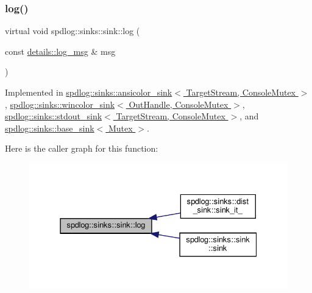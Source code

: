 \subsubsection{\texorpdfstring{log()}{log()}}
{\footnotesize\ttfamily virtual void spdlog\+::sinks\+::sink\+::log (\begin{DoxyParamCaption}\item[{const \hyperlink{structspdlog_1_1details_1_1log__msg}{details\+::log\+\_\+msg} \&}]{msg }\end{DoxyParamCaption})\hspace{0.3cm}{\ttfamily [pure virtual]}}



Implemented in \hyperlink{classspdlog_1_1sinks_1_1ansicolor__sink_a042a6ab886430570095737e1984e7c6e}{spdlog\+::sinks\+::ansicolor\+\_\+sink$<$ Target\+Stream, Console\+Mutex $>$}, \hyperlink{classspdlog_1_1sinks_1_1wincolor__sink_a64d98363a05d1a7a4f295f6de1b5cec1}{spdlog\+::sinks\+::wincolor\+\_\+sink$<$ Out\+Handle, Console\+Mutex $>$}, \hyperlink{classspdlog_1_1sinks_1_1stdout__sink_adda1fffa1daf4565f72b3e94734d984a}{spdlog\+::sinks\+::stdout\+\_\+sink$<$ Target\+Stream, Console\+Mutex $>$}, and \hyperlink{classspdlog_1_1sinks_1_1base__sink_a6a72602ffe60fdfe6a3cbfbecca54bb0}{spdlog\+::sinks\+::base\+\_\+sink$<$ Mutex $>$}.

Here is the caller graph for this function\+:
\nopagebreak
\begin{figure}[H]
\begin{center}
\leavevmode
\includegraphics[width=331pt]{classspdlog_1_1sinks_1_1sink_a51d8f34ad79064e0dc13c6013236e427_icgraph}
\end{center}
\end{figure}
\mbox{\label{classspdlog_1_1sinks_1_1sink_ac410f2229e583a75337a5fdf45d020be}} 
